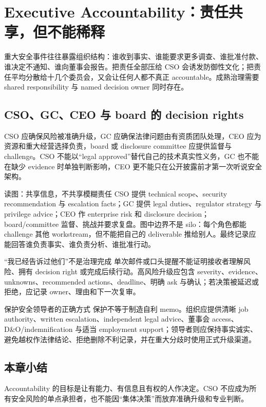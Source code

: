 \section{Executive Accountability：责任共享，但不能稀释}

重大安全事件往往暴露组织结构：谁收到事实、谁能要求更多调查、谁批准付款、谁决定不通知、谁向董事会报告。把责任全部压给 CSO 会诱发防御性文化；把责任平均分散给十几个委员会，又会让任何人都不真正 accountable。成熟治理需要 shared responsibility 与 named decision owner 同时存在。

\subsection{CSO、GC、CEO 与 board 的 decision rights}

CSO 应确保风险被准确升级，GC 应确保法律问题由有资质团队处理，CEO 应为资源和重大经营选择负责，board 或 disclosure committee 应提供监督与 challenge。CSO 不能以“legal approved”替代自己的技术真实性义务，GC 也不能在缺少 evidence 时单独判断影响，CEO 更不能只在公开披露前才第一次听说安全架构。


\begin{knowledgebox}{读图：共享信息，不共享模糊责任}
CSO 提供 technical scope、security recommendation 与 escalation facts；GC 提供 legal duties、regulator strategy 与 privilege advice；CEO 作 enterprise risk 和 disclosure decision；board/committee 监督、挑战并要求复盘。图中边界不是 silo：每个角色都能 challenge 其他 workstream，但不能把自己的 deliverable 推给别人。最终记录应能回答谁负责事实、谁负责分析、谁批准行动。
\end{knowledgebox}


\begin{warningbox}{“我已经告诉过他们”不是治理完成}
单次邮件或口头提醒不能证明接收者理解风险、拥有 decision right 或完成后续行动。高风险升级应包含 severity、evidence、unknowns、recommended actions、deadline、明确 ask 与确认；若决策被延迟或拒绝，应记录 owner、理由和下一次复审。
\end{warningbox}

\begin{importantbox}{保护安全领导者的正确方式}
保护不等于制造自利 memo。组织应提供清晰 job authority、written escalation、independent legal advice、董事会 access、D\&O/indemnification 与适当 employment support；领导者则应保持事实诚实、避免越权作法律结论、拒绝删除不利记录，并在重大分歧时使用正式升级渠道。
\end{importantbox}

\subsection{本章小结}

Accountability 的目标是让有能力、有信息且有权的人作决定。CSO 不应成为所有安全风险的单点承担者，也不能因“集体决策”而放弃准确升级和专业判断。

